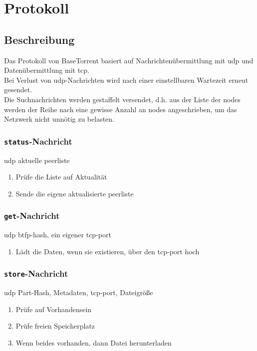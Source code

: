 \section{Protokoll}

\subsection{Beschreibung}
Das Protokoll von BaseTorrent basiert auf Nachrichtenübermittlung mit \gls{udp} und Datenübermittlung mit \gls{tcp}.\\
Bei Verlust von \gls{udp}-Nachrichten wird nach einer einstellbaren Wartezeit erneut gesendet.\\
Die Suchnachrichten werden gestaffelt versendet, d.h. aus der Liste der \gls{node}s werden der Reihe nach eine gewisse Anzahl an \gls{node}s angeschrieben, um das Netzwerk nicht unnötig zu belasten.

\subsubsection{\texttt{status}-Nachricht}
\label{sec:statusmeldung}
{\gls{udp}}
{aktuelle \gls{peerliste}}
{\begin{enumerate}
	\item Prüfe die Liste auf Aktualität 
	\item Sende die eigene aktualisierte \gls{peerliste}
\end{enumerate}}


\subsubsection{\texttt{get}-Nachricht}
\label{proto:get}
{\gls{udp}}
{\gls{btfp}-\gls{hash}, ein eigener \gls{tcp}-\gls{port}}
{\begin{enumerate} \item Lädt die Daten, wenn sie existieren, über den \gls{tcp}-\gls{port} hoch \end{enumerate}}


\subsubsection{\texttt{store}-Nachricht}
\label{sec:speicheranfrage}
{\gls{udp}}
{Part-Hash, Metadaten, \gls{tcp}-\gls{port}, Dateigröße}
{\begin{enumerate}
	\item Prüfe auf Vorhandensein
	\item Prüfe freien Speicherplatz
	\item Wenn beides vorhanden, dann Datei herunterladen
\end{enumerate}}


